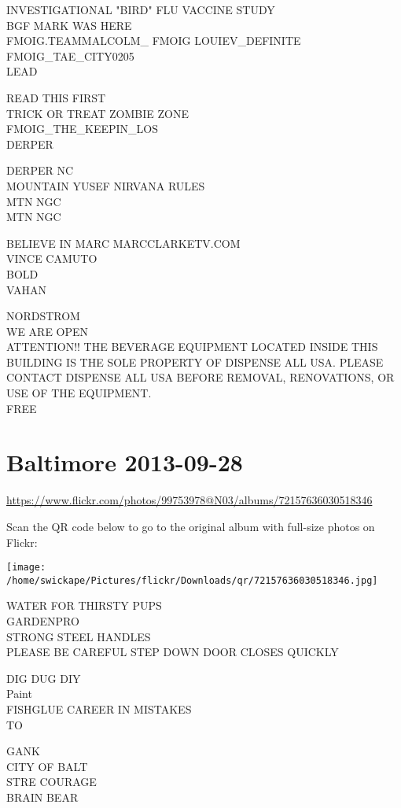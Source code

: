 \documentclass[10pt,letterpaper]{article}
\begin{document}
INVESTIGATIONAL "BIRD" FLU VACCINE STUDY\\
BGF MARK WAS HERE\\
FMOIG.TEAMMALCOLM\_ FMOIG LOUIEV\_DEFINITE FMOIG\_TAE\_CITY0205\\
LEAD

READ THIS FIRST\\
TRICK OR TREAT ZOMBIE ZONE\\
FMOIG\_THE\_KEEPIN\_LOS\\
DERPER

DERPER NC\\
MOUNTAIN YUSEF NIRVANA RULES\\
MTN NGC\\
MTN NGC

BELIEVE IN MARC MARCCLARKETV.COM\\
VINCE CAMUTO\\
BOLD\\
VAHAN

NORDSTROM\\
WE ARE OPEN\\
ATTENTION!! THE BEVERAGE EQUIPMENT LOCATED INSIDE THIS BUILDING IS THE SOLE PROPERTY OF DISPENSE ALL USA.  PLEASE CONTACT DISPENSE ALL USA BEFORE REMOVAL, RENOVATIONS, OR USE OF THE EQUIPMENT.\\
FREE


\section*{Baltimore 2013-09-28}

\url{https://www.flickr.com/photos/99753978@N03/albums/72157636030518346}

Scan the QR code below to go to the original album with full-size photos on Flickr:

\texttt{[image: /home/swickape/Pictures/flickr/Downloads/qr/72157636030518346.jpg]}


WATER FOR THIRSTY PUPS\\
GARDENPRO\\
STRONG STEEL HANDLES\\
PLEASE BE CAREFUL STEP DOWN DOOR CLOSES QUICKLY

DIG DUG DIY\\
Paint\\
FISHGLUE CAREER IN MISTAKES\\
TO

GANK\\
CITY OF BALT\\
STRE COURAGE\\
BRAIN BEAR
\end{document}
